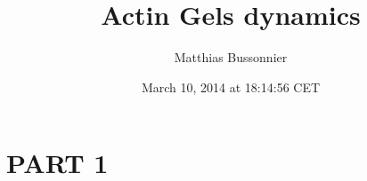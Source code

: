 \documentclass[A4paperpaper,11pt,english]{sphinxmanual}
\title{Actin Gels dynamics}
\date{March 10, 2014 at 18:14:56 CET}
\author{Matthias Bussonnier}
\begin{document}
\maketitle

\tableofcontents
\cleardoublepage
\pagestyle{normal}
 
\label{index-latex::doc}



\chapter{PART 1}
\label{parts/part1::doc}\label{parts/part1:contents}\label{parts/part1:part-1}
\end{document}
